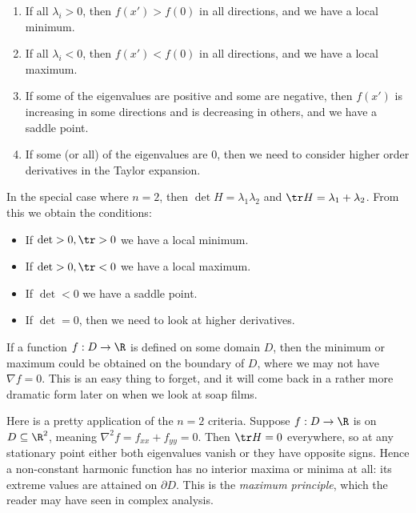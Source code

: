 \begin{enumerate}[label=(\roman*)]
	\item If all $\lambda_i > 0$, then $f(x') > f(0)$ in all directions, and we have a local minimum.
	\item If all $\lambda_i < 0$, then $f(x') < f(0)$ in all directions, and we have a local maximum.
	\item If some of the eigenvalues are positive and some are negative, then $f(x')$ is increasing in some directions and is decreasing in others, and we have a saddle point.
	\item If some (or all) of the eigenvalues are $0$, then we need to consider higher order derivatives in the Taylor expansion.
\end{enumerate}

In the special case where $n = 2$, then $\det H = \lambda_1 \lambda_2$ and $\tr H = \lambda_1 + \lambda_2$. From this we obtain the conditions:


\begin{itemize}
	\item If $\det > 0, \tr > 0$ we have a local minimum.
	\item If $\det > 0, \tr < 0$ we have a local maximum.
	\item If $\det < 0$ we have a saddle point.
	\item If $\det = 0$, then we need to look at higher derivatives.
\end{itemize}

\begin{remark}
	If a function $f: D \rightarrow \R$ is defined on some domain $D$, then the minimum or maximum could be obtained on the boundary of $D$, where we may not have $\nabla f = 0$.
	This is an easy thing to forget, and it will come back in a rather more dramatic form later on when we look at soap films.
\end{remark}

Here is a pretty application of the $n = 2$ criteria. Suppose $f: D \to \R$ is  on $D \subseteq \R^2$, meaning $\nabla^2 f = f_{xx} + f_{yy} = 0$. Then $\tr H = 0$ everywhere, so at any stationary point either both eigenvalues vanish or they have opposite signs. Hence a non-constant harmonic function has no interior maxima or minima at all: its extreme values are attained on $\partial D$. This is the \emph{maximum principle}, which the reader may have seen in complex analysis.

